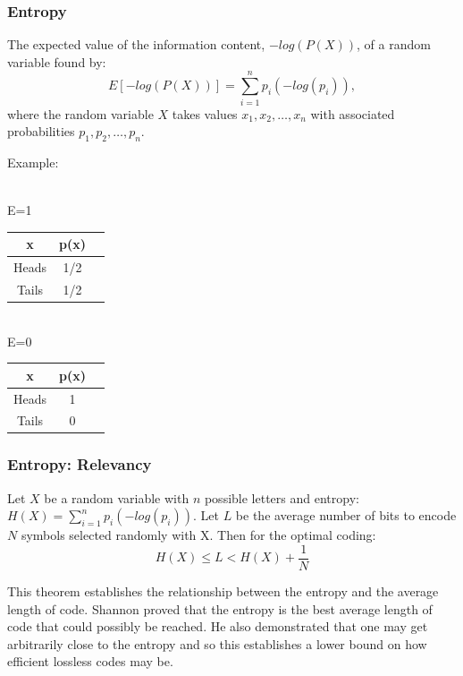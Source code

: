 \documentclass{beamer}
\theoremstyle{definition}
\begin{document}
\begin{frame}

\frametitle{Entropy}
\begin{definition}[Entropy]
The expected value of the information content, $-log(P(X))$, of a random variable found by: \[E\left[-log(P(X))\right]=\sum_{i=1}^{n}{{p_{i}}(-log(p_{i}))},\] where the random variable $X$ takes values $x_{1},x_{2},\ldots,x_{n}$ with associated probabilities $p_{1},p_{2},\ldots,p_{n}.$
\end{definition}

\pause

Example:
\begin{table}
\parbox{.4\linewidth}{
\hspace{1.5cm}{Fair Coin} \\E=1
\centering
\begin{tabular}{|c|c|c|}
\hline
x & p(x) \\ \hline
Heads & 1/2 \\
\hline
Tails & 1/2 \\
\hline
\end{tabular}
}
\parbox{.49\linewidth}{
\hspace{1.7cm}{Biased Coin} \\E=0
\centering
\begin{tabular}{|c|c|c|}
\hline
x & p(x) \\ \hline
Heads & 1 \\
\hline
Tails & 0 \\
\hline
\end{tabular}
}
\end{table}

\end{frame}

\begin{frame}

\frametitle{Entropy: Relevancy}
\begin{theorem}
Let $X$ be a random variable with $n$ possible letters and entropy: \\ $H(X)=\sum_{i=1}^{n}{{p_{i}}(-log(p_{i}))}$. Let $L$ be the average number of bits to encode $N$ symbols selected randomly with X. Then for the optimal coding:
\begin{displaymath}
H(X) \leq L < H(X) + \frac{1}{N}
\end{displaymath}

\end{theorem}

This theorem establishes the relationship between the entropy and the average length of code. Shannon proved that the entropy is the best average length of code that could possibly be reached. He also demonstrated that one may get arbitrarily close to the entropy and so this establishes a lower bound on how efficient lossless codes may be.

\end{frame}
\end{document}
